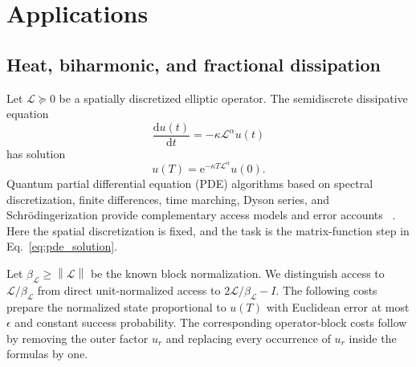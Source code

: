 \documentclass[aps,pra,reprint,floatfix,unsortedaddress,superscriptaddress]{revtex4-2}
\newcommand{\norm}[1]{\left\lVert#1\right\rVert}
\begin{document}
\section{Applications}
\label{sec:applications}

\subsection{Heat, biharmonic, and fractional dissipation}
\label{subsec:pde}

Let $\mathcal L\succeq0$ be a spatially discretized elliptic operator.
The semidiscrete dissipative equation
\begin{equation}
    \frac{\mathrm d u(t)}{\mathrm dt}
    =
    -\kappa\mathcal L^\alpha u(t)
    \label{eq:pde_family}
\end{equation}
has solution
\begin{equation}
    u(T)=
    \mathrm e^{-\kappa T\mathcal L^\alpha}u(0).
    \label{eq:pde_solution}
\end{equation}
Quantum partial differential equation (PDE) algorithms based on spectral discretization, finite
differences, time marching, Dyson series, and Schr\"odingerization
provide complementary access models and error accounts
~\cite{childs2020spectral,JIN2022111641,PhysRevA.108.032603,
Fang2023timemarchingbased,Berry_2024,PhysRevLett.133.230602,
jin2025schrodingerizationmethodlinearnonunitary,Gonzalez_Conde_2023}.
Here the spatial
discretization is fixed, and the task is the matrix-function step in
Eq.~\eqref{eq:pde_solution}.

Let $\beta_{\mathcal L}\geq\norm{\mathcal L}$ be the known block
normalization.  We distinguish access to
$\mathcal L/\beta_{\mathcal L}$ from direct unit-normalized access to
$2\mathcal L/\beta_{\mathcal L}-I$.  The following costs prepare the
normalized state proportional to $u(T)$ with Euclidean error at most
$\epsilon$ and constant success probability.  The corresponding
operator-block costs follow by removing the outer factor $u_r$ and
replacing every occurrence of $u_r$ inside the formulas by one.
\end{document}
